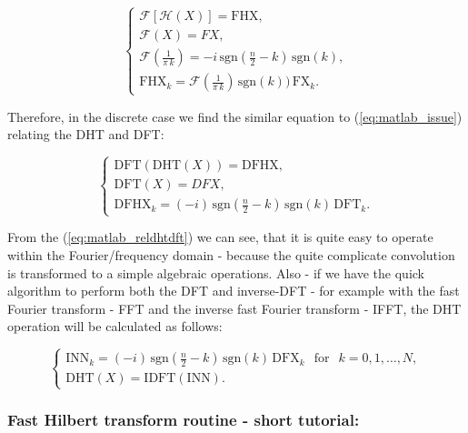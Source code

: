 \documentclass[12pt,twoside,a4paper]{article}
\numberwithin{equation}{subsection}
\numberwithin{figure}{subsection}
\begin{document}
\begin{equation} \label{eq:matlab_issue}
	\begin{cases}
	 \mathcal{F} \left[\mathcal{H}(X)\right] = \mathrm{FHX}, \\
	 \mathcal{F} (X) = FX, \\
	 \mathcal{F}(\frac {1}{\pi \, k}) = - i\,\mathrm{sgn}(\frac {n}{2} - k)\,\mathrm{sgn}(k), \\
	 \mathrm{FHX}_k = \mathcal{F}(\frac {1}{\pi \,k}) \, \mathrm{sgn}(k)) \, \mathrm{FX}_k.
	\end{cases}
\end{equation}

Therefore, in the discrete case we find the similar equation to (\ref{eq:matlab_issue}) relating the DHT and DFT:

\begin{equation} \label{eq:matlab_reldhtdft}
	\begin{cases}
		\mathrm{DFT}(\mathrm{DHT}(X)) = \mathrm{DFHX}, \\
		\mathrm{DFT}(X) = DFX, \\
		\mathrm{DFHX}_k = ( -i) \, \mathrm{sgn}(\frac{n}{2} - k) \, \mathrm{sgn}(k) \, \mathrm{DFT}_k.
	\end{cases}
\end{equation}

From the (\ref{eq:matlab_reldhtdft}) we can see, that it is quite easy to operate within the Fourier/frequency domain - because the quite complicate convolution is transformed to a simple algebraic operations. Also - if we have the quick algorithm to perform both the DFT and inverse-DFT - for example with the fast Fourier transform - FFT and the inverse fast Fourier transform - IFFT, the DHT operation will be calculated as follows:

\begin{equation} \label{eq:matlab_fulldhthdf}
	\begin{cases}
		\mathrm{INN}_k = (-i) \, \mathrm{sgn}(\frac{n}{2}-k) \, \mathrm{sgn}(k) \, \mathrm{DFX}_k \, \ \mbox{ for } \ \, k=0,1,\ldots, N, \\
		\mathrm{DHT}(X) = \mathrm{IDFT}(\mathrm{INN}).  
	\end{cases}
\end{equation}

\subsubsection*{Fast Hilbert transform routine - short tutorial:}
\end{document}
